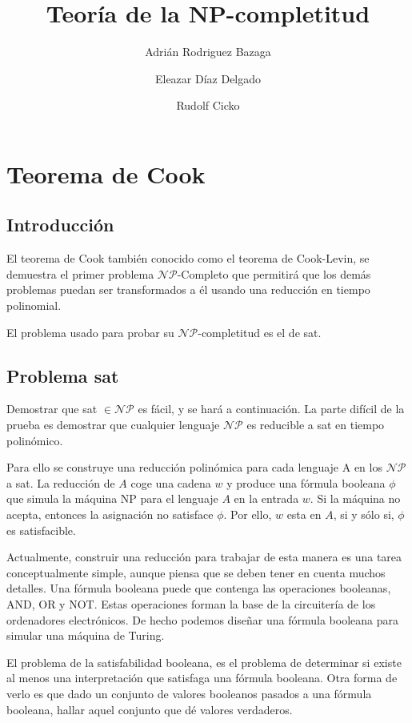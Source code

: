 \documentclass[a4paper, spanish, utf8]{memoir}
\title{\Huge Teoría de la NP-completitud}
\author{Adrián Rodriguez Bazaga}
\author{Eleazar Díaz Delgado}
\author{Rudolf Cicko}
\affil{Universidad de La Laguna}
\begin{document}
\maketitle

\chapter{Teorema de Cook}


\section{Introducción}

El teorema de Cook también conocido como el teorema de Cook-Levin, se demuestra
el primer problema $\mathcal{NP}$-Completo que permitirá que los demás problemas
puedan ser transformados a él usando una reducción en tiempo polinomial.

El problema usado para probar su $\mathcal{NP}$-completitud es el de \gls{sat}.

\section{Problema \gls{sat}}

Demostrar que \gls{sat} $\in \mathcal{NP}$ es fácil, y se hará a continuación.
La parte difícil de la prueba es demostrar que cualquier lenguaje $\mathcal{NP}$
es reducible a \gls{sat} en tiempo polinómico.

Para ello se construye una reducción polinómica para cada lenguaje A en los $\mathcal{NP}$ a
\gls{sat}. La reducción de $A$ coge una cadena $w$ y produce una fórmula booleana
$\phi$ que simula la máquina NP para el lenguaje $A$ en la entrada $w$. Si la
máquina no acepta, entonces la asignación no satisface $\phi$. Por ello, $w$ esta
en $A$, si y sólo si, $\phi$ es satisfacible.

Actualmente, construir una reducción para trabajar de esta manera es una tarea
conceptualmente simple, aunque piensa que se deben tener en cuenta muchos detalles. Una
fórmula booleana puede que contenga las operaciones booleanas, AND, OR y NOT. Estas
operaciones forman la base de la circuitería de los ordenadores electrónicos. De
hecho podemos diseñar una fórmula booleana para simular una máquina de Turing.

El problema de la satisfabilidad booleana, es el problema de determinar si
existe al menos una interpretación que satisfaga una fórmula booleana. Otra
forma de verlo es que dado un conjunto de valores booleanos pasados a una
fórmula booleana, hallar aquel conjunto que dé valores verdaderos.
\end{document}

